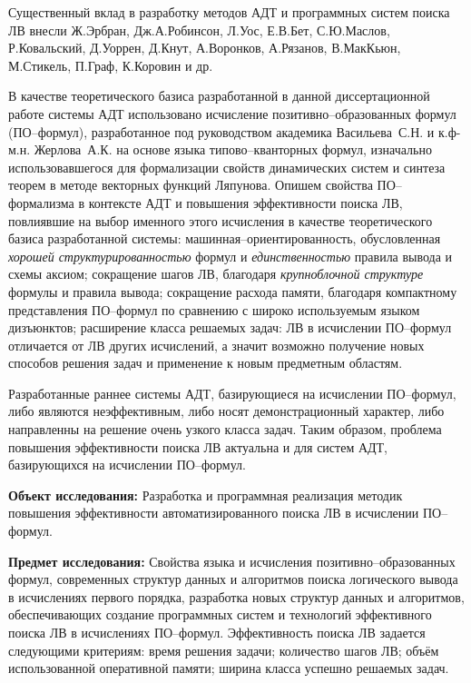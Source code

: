 \documentclass[a4paper]{report}
\begin{document}
Существенный вклад в разработку методов АДТ и программных систем поиска ЛВ внесли Ж.Эрбран, Дж.А.Робинсон, Л.Уос, Е.В.Бет, С.Ю.Маслов, Р.Ковальский, Д.Уоррен, Д.Кнут, А.Воронков, А.Рязанов, В.МакКьюн, М.Стикель, П.Граф, К.Коровин и др.

В качестве теоретического базиса разработанной в данной диссертационной работе системы АДТ использовано исчисление позитивно--образованных формул (ПО--формул), разработанное под руководством академика Васильева~С.Н. и к.ф-м.н. Жерлова~А.К. на основе языка типово--кванторных формул, изначально использовавшегося для формализации свойств динамических систем и синтеза теорем в методе векторных функций Ляпунова. Опишем свойства ПО--формализма в контексте АДТ и повышения эффективности поиска ЛВ, повлиявшие на выбор именного этого исчисления в качестве теоретического базиса разработанной системы: машинная--ориентированность, обусловленная \emph{хорошей структурированностью} формул и \emph{единственностью} правила вывода и схемы аксиом; сокращение шагов ЛВ, благодаря \emph{крупноблочной структуре} формулы и правила вывода; сокращение расхода памяти, благодаря компактному представления ПО--формул по сравнению с широко используемым языком дизъюнктов; расширение класса решаемых задач: ЛВ в исчислении ПО--формул отличается от ЛВ других исчислений, а значит возможно получение новых способов решения задач и применение к новым предметным областям.

Разработанные раннее системы АДТ, базирующиеся на исчислении ПО--формул, либо являются неэффективным, либо носят демонстрационный характер, либо направленны на решение очень узкого класса задач. Таким образом, проблема повышения эффективности поиска ЛВ актуальна и для систем АДТ, базирующихся на исчислении ПО--формул.

\textbf{Объект исследования:}
Разработка и программная реализация методик повышения эффективности автоматизированного поиска ЛВ в исчислении ПО--формул.

\textbf{Предмет исследования:}
Свойства языка и исчисления позитивно--образованных формул, современных структур данных и алгоритмов поиска логического вывода в исчислениях первого порядка, разработка новых структур данных и алгоритмов, обеспечивающих создание программных систем и технологий эффективного поиска ЛВ в исчислениях ПО--формул. Эффективность поиска ЛВ задается следующими критериям: время решения задачи; количество шагов ЛВ; объём использованной оперативной памяти; ширина класса успешно решаемых задач.
\end{document}
